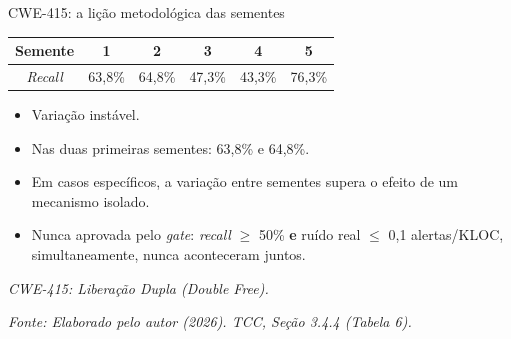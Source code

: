 \documentclass[
    aspectratio=169,
    12pt,
    brazil
]{beamer}
\newcommand{\fonte}[1]{{\tiny\itshape Fonte: #1\par}}
\begin{document}
\begin{frame}{CWE-415: a lição metodológica das sementes}
  \begin{center}
  \small
  \begin{tabular}{cccccc}
  \toprule
  Semente & 1 & 2 & 3 & 4 & 5 \\
  \midrule
  \textit{Recall} & 63,8\% & 64,8\% & 47,3\% & 43,3\% & 76,3\% \\
  \bottomrule
  \end{tabular}
  \end{center}
  \begin{itemize}
    \item Variação instável.
    \item Nas duas primeiras sementes: 63,8\% e 64,8\%.
    \item Em casos específicos, a variação entre sementes supera o efeito de um mecanismo isolado.
    \item Nunca aprovada pelo \textit{gate}: \textit{recall} $\geq$ 50\% \textbf{e} ruído real $\leq$ 0,1 alertas/KLOC, simultaneamente, nunca aconteceram juntos.
  \end{itemize}
  \vspace{0.1cm}
  \vfill
  {\tiny\itshape CWE-415: Liberação Dupla (\textit{Double Free}).\par}
  \fonte{Elaborado pelo autor (2026). TCC, Seção 3.4.4 (Tabela 6).}
\end{frame}
\end{document}

